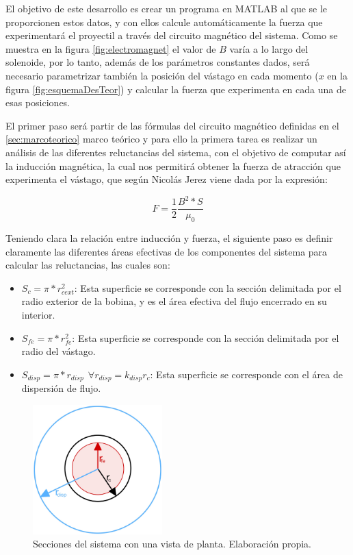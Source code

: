 El objetivo de este desarrollo es crear un programa en MATLAB al que se le proporcionen estos datos, y con ellos calcule automáticamente la fuerza que experimentará el proyectil a través del circuito magnético del sistema. Como se muestra en la figura \ref{fig:electromagnet} el valor de \(B\) varía a lo largo del solenoide, por lo tanto, además de los parámetros constantes dados, será necesario parametrizar también la posición del vástago en cada momento (\(x\) en la figura \ref{fig:esquemaDesTeor}) y calcular la fuerza que experimenta en cada una de esas posiciones.

El primer paso será partir de las fórmulas del circuito magnético definidas en el \ref{sec:marcoteorico} marco teórico y para ello la primera tarea es realizar un análisis de las diferentes reluctancias del sistema, con el objetivo de computar así la inducción magnética, la cual nos permitirá obtener la fuerza de atracción que experimenta el vástago, que según Nicolás Jerez \citep{jerez2016resueltos} viene dada por la expresión:

\begin{center}
\[F=\frac{1}{2}\frac{B^2*S}{\mu_0}\]
\end{center}

Teniendo clara la relación entre inducción y fuerza, el siguiente paso es definir claramente las diferentes áreas efectivas de los componentes del sistema para calcular las reluctancias, las cuales son:

\begin{itemize}
    \item \(S_{c}=\pi *r_{cext}^2\): Esta superficie se corresponde con la sección delimitada por el radio exterior de la bobina, y es el área efectiva del flujo encerrado en su interior.
    \item \(S_{fe}=\pi *r_{fe}^2\): Esta superficie se corresponde con la sección delimitada por el radio del vástago.
    \item \(S_{disp}=\pi *r_{disp}~~\forall r_{disp} = k_{disp}r_c\): Esta superficie se corresponde con el área de dispersión de flujo.
\end{itemize}

\begin{figure}[H]
    \centering
    \includegraphics[width=5cm]{FigurasMemoria/areasFlujo.jpg}
    \caption{Secciones del sistema con una vista de planta. Elaboración propia.}
    \label{fig:areasFlujo} %
\end{figure}

